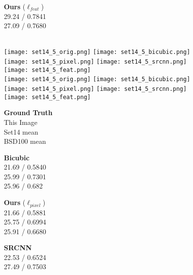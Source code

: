 \documentclass[runningheads]{llncs}
\begin{document}
\begin{figure}[t]
\begin{minipage}{\mywidth}
  \end{minipage}
  \begin{minipage}{\mywidth}
    \centering \textbf{Ours} ($\ell_{feat}$) \\ 29.24 / 0.7841 \\ 27.09 / 0.7680
  \end{minipage} \\
  \vspace{1mm}
  \texttt{[image: set14\_5\_orig.png]}
  \texttt{[image: set14\_5\_bicubic.png]}
  \texttt{[image: set14\_5\_pixel.png]}
  \texttt{[image: set14\_5\_srcnn.png]}
  \texttt{[image: set14\_5\_feat.png]} \\
  \texttt{[image: set14\_5\_orig.png]}
  \texttt{[image: set14\_5\_bicubic.png]}
  \texttt{[image: set14\_5\_pixel.png]}
  \texttt{[image: set14\_5\_srcnn.png]}
  \texttt{[image: set14\_5\_feat.png]}
  \vspace{1mm}
  \begin{minipage}{0.20\textwidth}
    \centering \textbf{Ground Truth} \\ This Image \\ Set14 mean \\ BSD100 mean
  \end{minipage}
  \hspace{-0.02\textwidth}
  \begin{minipage}{\mywidth}
    \centering \textbf{Bicubic} \\ 21.69 / 0.5840 \\ 25.99 / 0.7301 \\ 25.96 / 0.682
  \end{minipage}
  \begin{minipage}{\mywidth}
    \centering \textbf{Ours} ($\ell_{pixel}$) \\ 21.66 / 0.5881 \\ 25.75 / 0.6994 \\ 25.91 / 0.6680
  \end{minipage}
  \begin{minipage}{\mywidth}
    \centering \textbf{SRCNN}~\cite{dong2014learning} \\ 22.53 / 0.6524 \\ 27.49 / 0.7503 \\ 

\end{minipage}
\end{figure}
\end{document}
